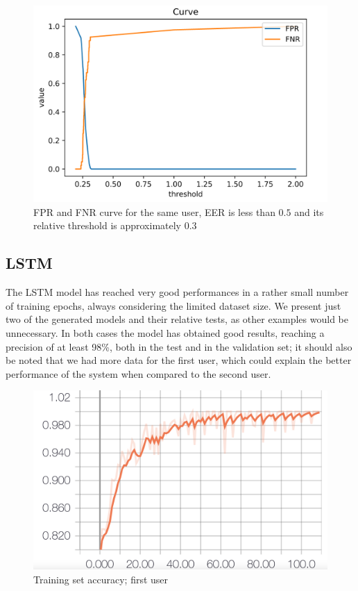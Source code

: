 \documentclass[8pt,notitlepage]{report}
\begin{document}
			\begin{figure}[H]
				\begin{center}
					\includegraphics[scale=.35]{fpr_fnr_FDTW_Dario}
					\caption{FPR and FNR curve for the same user, EER is less than $ 0.5 $ and its relative threshold is approximately $ 0.3 $}
				\end{center}
			\end{figure}

		
		\subsection{LSTM}
		
			The LSTM model has reached very good performances in a rather small number of training epochs, always considering the limited dataset size. We present just two of the generated models and their relative tests, as other examples would be unnecessary. In both cases the model has obtained good results, reaching a precision of at least 98\%, both in the test and in the validation set; it should also be noted that we had more data for the first user, which could explain the better performance of the system when compared to the second user. 
			\begin{figure}[H]
				\begin{center}
					\includegraphics[scale=.1865]{acc_Antonio}
					\caption{Training set accuracy; first user}
					\label{fig:acc_train_Antonio}
				\end{center}
			\end{figure}
			
\end{document}
